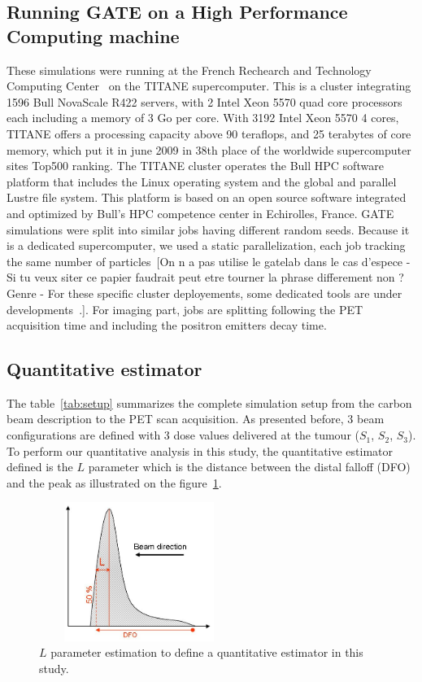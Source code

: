 \documentclass[11pt]{iopart}
\newcommand{\sjnote}[1]{{\color{red}[#1]}}
\begin{document}
\subsection{Running GATE on a High Performance Computing machine}

These simulations were running at the French Rechearch and Technology
Computing Center~\cite{CCRT} on the TITANE supercomputer. This is a
cluster integrating 1596 Bull NovaScale R422 servers, with 2 Intel
Xeon 5570 quad core processors each including a memory of 3 Go per
core. With 3192 Intel Xeon 5570 4 cores, TITANE offers a processing
capacity above 90 teraflops, and 25 terabytes of core memory, which
put it in june 2009 in 38th place of the worldwide supercomputer sites
Top500 ranking. The TITANE cluster operates the Bull HPC software
platform that includes the Linux operating system and the global and
parallel Lustre file system. This platform is based on an open source
software integrated and optimized by Bull's HPC competence center in
Echirolles, France. GATE simulations were split into similar jobs
having different random seeds. Because it is a dedicated
supercomputer, we used a static parallelization, each job tracking the
same number of particles~\cite{Camarasu-Pop2010}\sjnote{On n a pas utilise le gatelab dans le cas d'espece - Si tu veux siter ce papier faudrait peut etre tourner la phrase differement non ? Genre - For these specific cluster deployements, some dedicated tools are under developments~\cite{Camarasu-Pop2010}.}.
For imaging part, jobs are splitting following the PET acquisition time and including the positron emitters decay time. 

\subsection{Quantitative estimator}

The table~\ref{tab:setup} summarizes the complete simulation setup from the carbon beam description to the PET scan acquisition. As presented before, 3 beam configurations are defined with 3 dose values delivered at the tumour ($S_{1}$, $S_{2}$, $S_{3}$). To perform our quantitative analysis in this study, the quantitative estimator defined is the $L$ parameter which is the distance between the distal falloff (DFO) and the peak as illustrated on the figure~\ref{fig:dfo}.

\begin{figure}[!h]
  \centering
  \includegraphics[width=65mm,height=45mm]{figures/dfo.jpg}
  \caption{$L$ parameter estimation to define a quantitative estimator in this study.}
  
\label{fig:dfo}
\end{figure}
\end{document}
